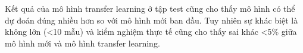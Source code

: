 Kết quả của mô hình transfer learning ở tập test cũng cho thấy mô hình có thể dự đoán đúng nhiều hơn so với mô hình mới ban đầu. Tuy nhiên sự khác biệt là không lớn (<10 mẫu) và kiểm nghiệm thực tế cũng cho thấy sai khác <5\% giữa mô hình mới và mô hình transfer learning.











